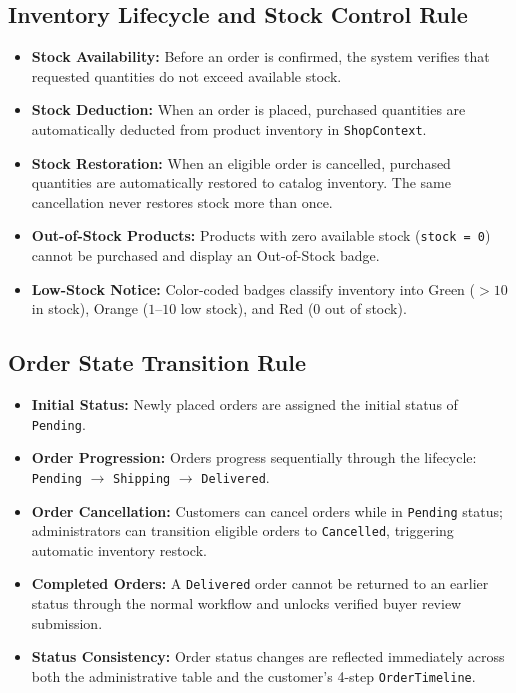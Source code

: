 \documentclass[12pt,a4paper,oneside]{report}
\begin{document}
\subsection{Inventory Lifecycle and Stock Control Rule}
\begin{itemize}[leftmargin=1.2cm]
    \item \textbf{Stock Availability:} Before an order is confirmed, the system verifies that requested quantities do not exceed available stock.
    \item \textbf{Stock Deduction:} When an order is placed, purchased quantities are automatically deducted from product inventory in \texttt{ShopContext}.
    \item \textbf{Stock Restoration:} When an eligible order is cancelled, purchased quantities are automatically restored to catalog inventory. The same cancellation never restores stock more than once.
    \item \textbf{Out-of-Stock Products:} Products with zero available stock (\texttt{stock = 0}) cannot be purchased and display an Out-of-Stock badge.
    \item \textbf{Low-Stock Notice:} Color-coded badges classify inventory into Green ($>10$ in stock), Orange ($1$--$10$ low stock), and Red ($0$ out of stock).
\end{itemize}

\subsection{Order State Transition Rule}
\begin{itemize}[leftmargin=1.2cm]
    \item \textbf{Initial Status:} Newly placed orders are assigned the initial status of \texttt{Pending}.
    \item \textbf{Order Progression:} Orders progress sequentially through the lifecycle: \texttt{Pending} $\rightarrow$ \texttt{Shipping} $\rightarrow$ \texttt{Delivered}.
    \item \textbf{Order Cancellation:} Customers can cancel orders while in \texttt{Pending} status; administrators can transition eligible orders to \texttt{Cancelled}, triggering automatic inventory restock.
    \item \textbf{Completed Orders:} A \texttt{Delivered} order cannot be returned to an earlier status through the normal workflow and unlocks verified buyer review submission.
    \item \textbf{Status Consistency:} Order status changes are reflected immediately across both the administrative table and the customer's 4-step \texttt{OrderTimeline}.
\end{itemize}
\end{document}
